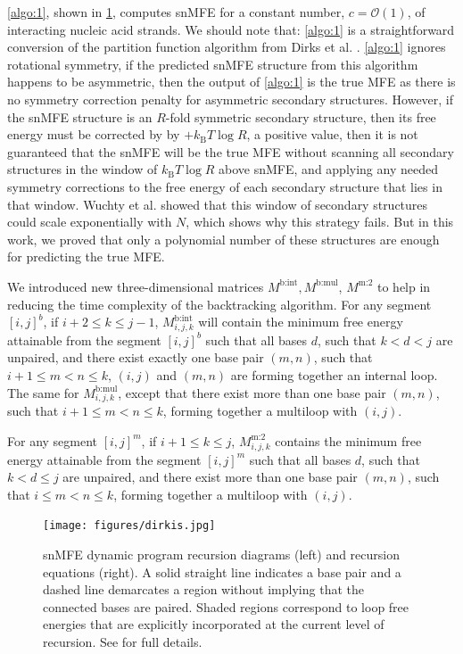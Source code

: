 \documentclass[11pt,letterpaper]{article}  \usepackage[margin=1in]{geometry}
\theoremstyle{definition}  \newtheorem{Definition}[theorem]{Definition}
\newcommand{\snMFE}{snMFE\xspace}
\begin{document}
\cref{algo:1}, shown in \cref{fig:mfe}, computes \snMFE  for a constant number, $c=\mathcal{O}(1)$, of interacting nucleic acid strands. 
We should note that: \cref{algo:1} is a straightforward conversion of the partition function algorithm from Dirks et al. \cite{dirks2007thermodynamic}. 
\cref{algo:1} ignores rotational symmetry, 
if the predicted \snMFE structure from this algorithm happens to be asymmetric, 
then the output of \cref{algo:1} is the true MFE as there is no symmetry correction penalty for asymmetric secondary structures.
However, if the \snMFE structure is an $R$-fold symmetric secondary structure, then its free energy must be corrected by by $+k_\mathrm{B} T \log R$, a positive value, then it is not guaranteed that the \snMFE will be the true MFE without scanning all secondary structures in the window of $k_\mathrm{B} T \log R$ above \snMFE, and applying any needed symmetry corrections to the free energy of each secondary structure that lies in that window. Wuchty et al. \cite{wuchty1999complete} showed that this window of secondary structures could scale exponentially with $N$, which shows why this strategy fails. But in this work, we proved that only a polynomial number of these structures are enough for predicting the true MFE. 

We introduced new three-dimensional matrices $M^\text{b:int}, M^\text{b:mul}$,  $M^\text{m:2}$ to help in reducing the time complexity of the backtracking algorithm. For any segment $[i,j]^b$, if $i+2 \leq k \leq j-1$, $M_{i,j,k}^\text{b:int}$ will contain the minimum free energy attainable from the segment $[i,j]^b$ such that all bases $d$, such that $k<d<j$ are unpaired, and there exist exactly one base pair $(m,n)$, such that $i+1 \leq m < n \leq k$, $(i,j)$ and $(m,n)$ are forming together an internal loop. The same for $M_{i,j,k}^\text{b:mul}$, except that there exist more than one base pair $(m,n)$, such that $i+1 \leq m < n \leq k$, forming together a multiloop with $(i,j)$.  


For any segment $[i,j]^m$, if $i+1 \leq k \leq j$, $M_{i,j,k}^\text{m:2}$ contains the minimum free energy attainable from the segment $[i,j]^m$ such that all bases $d$, such that $k<d \leq j$ are unpaired, and there exist more than one base pair $(m,n)$, such that $i \leq m < n \leq k$, forming together a multiloop with $(i,j)$.    





\begin{figure}[H]
	\centering\texttt{[image: figures/dirkis.jpg]}
	\caption{\snMFE dynamic program recursion diagrams (left) and recursion equations (right). A solid straight line indicates a base pair and
		a dashed line demarcates a region without implying that the connected bases are paired. Shaded regions correspond to loop free energies that are	explicitly incorporated at the current level of recursion. See \cite{dirks2003partition, fornace2020unified} for  full details.  
	}\label{fig:mfe}
\end{figure}
\end{document}
